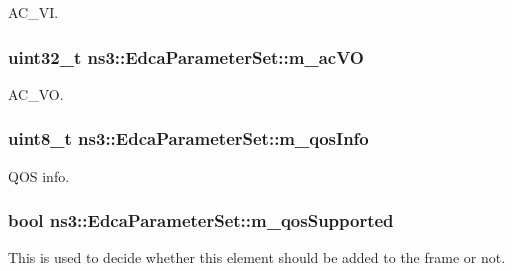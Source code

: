 A\+C\+\_\+\+VI. 

\subsubsection[{\texorpdfstring{m\+\_\+ac\+VO}{m_acVO}}]{\setlength{\rightskip}{0pt plus 5cm}uint32\+\_\+t ns3\+::\+Edca\+Parameter\+Set\+::m\+\_\+ac\+VO\hspace{0.3cm}{\ttfamily [private]}}\hypertarget{classns3_1_1EdcaParameterSet_a870fca52aca9ea9526171bb87378355d}{}\label{classns3_1_1EdcaParameterSet_a870fca52aca9ea9526171bb87378355d}


A\+C\+\_\+\+VO. 

\subsubsection[{\texorpdfstring{m\+\_\+qos\+Info}{m_qosInfo}}]{\setlength{\rightskip}{0pt plus 5cm}uint8\+\_\+t ns3\+::\+Edca\+Parameter\+Set\+::m\+\_\+qos\+Info\hspace{0.3cm}{\ttfamily [private]}}\hypertarget{classns3_1_1EdcaParameterSet_ac7bf02b9943d07176358715f38a894ae}{}\label{classns3_1_1EdcaParameterSet_ac7bf02b9943d07176358715f38a894ae}


Q\+OS info. 

\subsubsection[{\texorpdfstring{m\+\_\+qos\+Supported}{m_qosSupported}}]{\setlength{\rightskip}{0pt plus 5cm}bool ns3\+::\+Edca\+Parameter\+Set\+::m\+\_\+qos\+Supported\hspace{0.3cm}{\ttfamily [private]}}\hypertarget{classns3_1_1EdcaParameterSet_a96ff9c3d2e5083cedfcfd5e8f567118d}{}\label{classns3_1_1EdcaParameterSet_a96ff9c3d2e5083cedfcfd5e8f567118d}


This is used to decide whether this element should be added to the frame or not. 

